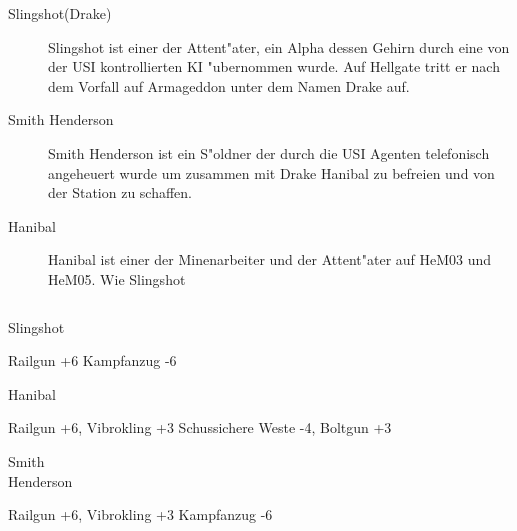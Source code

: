 \begin{column}[l]{0.45}
    \begin{description}
        \item[Slingshot(Drake)] Slingshot ist einer der Attent"ater, ein Alpha dessen Gehirn durch eine von der USI 
            kontrollierten KI "ubernommen wurde. Auf Hellgate tritt er nach dem Vorfall auf Armageddon unter dem Namen Drake auf.
        \item[Smith Henderson] Smith Henderson ist ein S"oldner der durch die USI Agenten telefonisch angeheuert wurde um 
            zusammen mit Drake Hanibal zu befreien und von der Station zu schaffen.
        \item[Hanibal] Hanibal ist einer der Minenarbeiter und der Attent"ater auf HeM03 und HeM05. Wie Slingshot 
    \end{description}
\end{column}
\begin{column}[r]{0.45}
    \begin{nscsheet}[h]{Slingshot}
        \nscstats[ATT=3,AGG=3,EMP=3,KNO=1,HP=10]
        \nscruler
        \begin{nscinventory}
            \nscitem[Waffen] Railgun +6
            \nscitem[R"ustung] Kampfanzug -6           
        \end{nscinventory}
    \end{nscsheet}    

    \begin{nscsheet}[h]{Hanibal}
        \nscstats[ATT=4,AGG=3,EMP=3,KNO=1,HP=12]
        \nscruler
        \begin{nscinventory}
            \nscitem[Waffen] Railgun +6, Vibrokling +3
            \nscitem[R"ustung] Schussichere Weste -4, Boltgun +3           
        \end{nscinventory}
    \end{nscsheet} 

    \begin{nscsheet}[h]{Smith\\ Henderson}
        \nscstats[ATT=5,AGG=4,EMP=1,KNO=1,HP=12]
        \nscruler
        \begin{nscinventory}
            \nscitem[Waffen] Railgun +6, Vibrokling +3
            \nscitem[R"ustung] Kampfanzug -6           
        \end{nscinventory}
    \end{nscsheet}
\end{column}


\newpage
{}

